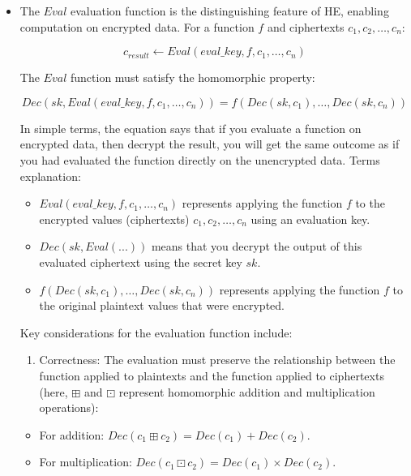 \documentclass[
  letterpaper,
  DIV=11,
  numbers=noendperiod,
  oneside]{scrartcl}
\providecommand{\tightlist}{%
  \setlength{\itemsep}{0pt}\setlength{\parskip}{0pt}}\usepackage{longtable,booktabs,array}
\begin{document}
\begin{itemize}
\item
  The \(Eval\) evaluation function is the distinguishing feature of HE,
  enabling computation on encrypted data. For a function \(f\) and
  ciphertexts \(c_1, c_2, \dots, c_n\):

  \[
  c_{result} \leftarrow Eval(eval\_key, f, c_1, \dots, c_n)
  \]

  The \(Eval\) function must satisfy the homomorphic property:

  \[
  Dec(sk, Eval(eval\_key, f, c_1, \dots, c_n)) = f(Dec(sk, c_1), \dots, Dec(sk, c_n))
  \]

  In simple terms, the equation says that if you evaluate a function on
  encrypted data, then decrypt the result, you will get the same outcome
  as if you had evaluated the function directly on the unencrypted data.
  Terms explanation:

  \begin{itemize}
  \item
    \(Eval(eval\_key, f, c_1, \dots, c_n)\) represents applying the
    function \(f\) to the encrypted values (ciphertexts)
    \(c_1, c_2, \dots, c_n\) using an evaluation key.
  \item
    \(Dec(sk, Eval(...))\) means that you decrypt the output of this
    evaluated ciphertext using the secret key \(sk\).
  \item
    \(f(Dec(sk, c_1), \dots, Dec(sk, c_n))\) represents applying the
    function \(f\) to the original plaintext values that were encrypted.
  \end{itemize}

  Key considerations for the evaluation function include:

  \begin{enumerate}
  \def\labelenumi{\arabic{enumi}.}
  \tightlist
  \item
    Correctness: The evaluation must preserve the relationship between
    the function applied to plaintexts and the function applied to
    ciphertexts (here, \(\boxplus\) and \(\boxdot\) represent
    homomorphic addition and multiplication operations):
  \end{enumerate}

  \begin{itemize}
  \item
    For addition: \(Dec(c_1 \boxplus c_2) = Dec(c_1) + Dec(c_2)\).
  \item
    For multiplication:
    \(Dec(c_1 \boxdot c_2) = Dec(c_1) \times Dec(c_2)\).
  \end{itemize}


\end{itemize}
\end{document}

